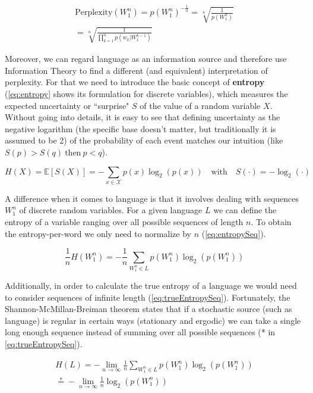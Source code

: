 \begin{equation} \label{eq:pp}
	\begin{gathered}
		\text{Perplexity}(W_1^n) = p(W_1^n)^{-\frac{1}{n}} = \sqrt[n]{\frac{1}{p(W_1^n)}} \\
		= \sqrt[n]{\frac{1}{\prod_{k=1}^{n} p(w_k|W_{1}^{k-1})}}
	\end{gathered}
\end{equation}

Moreover, we can regard language as an information source and therefore use Information Theory to find a different (and equivalent) interpretation of perplexity. For that we need to introduce the basic concept of \textbf{entropy} (\autoref{eq:entropy} shows its formulation for discrete variables), which measures the expected uncertainty or ``surprise" $S$ of the value of a random variable $X$. Without going into details, it is easy to see that defining uncertainty as the negative logarithm (the specific base doesn't matter, but traditionally it is assumed to be 2) of the probability of each event matches our intuition (like $S(p)>S(q) \ \text{then} \ p<q$).

\begin{equation} \label{eq:entropy}
	H(X)=\mathbb{E}[S(X)]=-\sum_{x \in \mathcal{X}}p(x)\log_2(p(x)) \quad \text{with} \quad S(\cdot)=-\log_2(\cdot)
\end{equation}

A difference when it comes to language is that it involves dealing with sequences $W_1^n$ of discrete random variables. For a given language $L$ we can define the entropy of a variable ranging over all possible sequences of length $n$. To obtain the entropy-per-word we only need to normalize by $n$ (\autoref{eq:entropySeq}).

\begin{equation} \label{eq:entropySeq}
	\frac{1}{n} H(W_1^n) = -\frac{1}{n}\sum_{W_1^n \in L}p(W_1^n)\log_2(p(W_1^n))
\end{equation}

Additionally, in order to calculate the true entropy of a language we would need to consider sequences of infinite length (\autoref{eq:trueEntropySeq}). Fortunately, the Shannon-McMillan-Breiman theorem states that if a stochastic source (such as language) is regular in certain ways (stationary and ergodic) we can take a single long enough sequence instead of summing over all possible sequences (* in \autoref{eq:trueEntropySeq}).

\begin{equation} \label{eq:trueEntropySeq}
	\begin{gathered}
		H(L) = -\lim\limits_{n \rightarrow \infty}\frac{1}{n}\sum_{W_1^n \in L}p(W_1^n)\log_2(p(W_1^n))\\
		\stackrel{*}{=} -\lim\limits_{n \rightarrow \infty}\frac{1}{n}\log_2(p(W_1^n))
	\end{gathered}
\end{equation}

